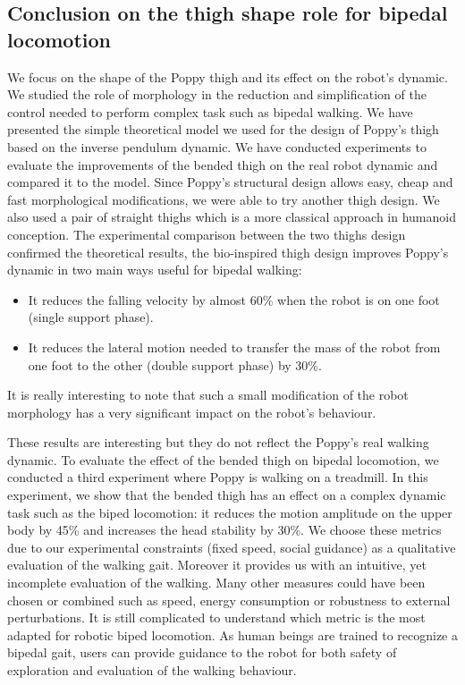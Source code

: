 \subsection{Conclusion on the thigh shape role for bipedal locomotion} %
We focus on the shape of the Poppy thigh and its effect on the robot’s dynamic. We studied the role of morphology in the reduction and simplification of the control needed to perform complex task such as bipedal walking. We have presented the simple theoretical model we used for the design of Poppy’s thigh based on the inverse pendulum dynamic. We have conducted experiments to evaluate the improvements of the bended thigh on the real robot dynamic and compared it to the model. Since Poppy’s structural design allows easy, cheap and fast morphological modifications, we were able to try another thigh design. We also used a pair of straight thighs which is a more classical approach in humanoid conception. The experimental comparison between the two thighs design confirmed the theoretical results, the bio-inspired thigh design improves Poppy’s dynamic in two main ways useful for bipedal walking:
\begin{itemize}
    \item It reduces the falling velocity by almost 60\% when the robot is on one foot (single support phase).
    \item It reduces the lateral motion needed to transfer the mass of the robot from one foot to the other (double support phase) by 30\%.
\end{itemize}
It is really interesting to note that such a small modification of the robot morphology has a very significant impact on the robot’s behaviour.

These results are interesting but they do not reflect the Poppy’s real walking dynamic. To evaluate the effect of the bended thigh on bipedal locomotion, we conducted a third experiment where Poppy is walking on a treadmill. In this experiment, we show that the bended thigh has an effect on a complex dynamic task such as the biped locomotion: it reduces the motion amplitude on the upper body  by 45\% and increases the head stability by 30\%. We choose these metrics due to our experimental constraints (fixed speed, social guidance) as a qualitative evaluation of the walking gait. Moreover it provides us with an intuitive, yet incomplete evaluation of the walking. Many other measures could have been chosen or combined such as speed, energy consumption or robustness to external perturbations. It is still complicated to understand which metric is the most adapted for robotic biped locomotion. As human beings are trained to recognize a bipedal gait, users can provide guidance to the robot for both safety of exploration and evaluation of the walking behaviour.




